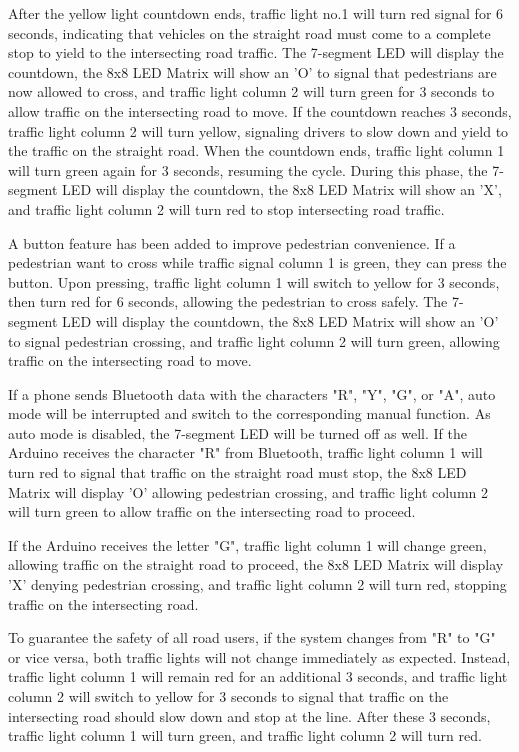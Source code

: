\documentclass[conference, onecolumn]{IEEEtran}
\begin{document}
After the yellow light countdown ends, traffic light no.1 will turn red signal for 6 seconds, indicating that vehicles on the straight road must come to a complete stop to yield to the intersecting road traffic. The 7-segment LED will display the countdown, the 8x8 LED Matrix will show an 'O' to signal that pedestrians are now allowed to cross, and traffic light column 2 will turn green for 3 seconds to allow traffic on the intersecting road to move. If the countdown reaches 3 seconds, traffic light column 2 will turn yellow, signaling drivers to slow down and yield to the traffic on the straight road. When the countdown ends, traffic light column 1 will turn green again for 3 seconds, resuming the cycle. During this phase, the 7-segment LED will display the countdown, the 8x8 LED Matrix will show an 'X', and traffic light column 2 will turn red to stop intersecting road traffic.\par

A button feature has been added to improve pedestrian convenience. If a pedestrian want to cross while traffic signal column 1 is green, they can press the button. Upon pressing, traffic light column 1 will switch to yellow for 3 seconds, then turn red for 6 seconds, allowing the pedestrian to cross safely. The 7-segment LED will display the countdown, the 8x8 LED Matrix will show an 'O' to signal pedestrian crossing, and traffic light column 2 will turn green, allowing traffic on the intersecting road to move.\par

If a phone sends Bluetooth data with the characters "R", "Y", "G", or "A", auto mode will be interrupted and switch to the corresponding manual function. As auto mode is disabled, the 7-segment LED will be turned off as well. If the Arduino receives the character "R" from Bluetooth, traffic light column 1 will turn red to signal that traffic on the straight road must stop, the 8x8 LED Matrix will display 'O' allowing pedestrian crossing, and traffic light column 2 will turn green to allow traffic on the intersecting road to proceed.\par

If the Arduino receives the letter "G", traffic light column 1 will change green, allowing traffic on the straight road to proceed, the 8x8 LED Matrix will display 'X' denying pedestrian crossing, and traffic light column 2 will turn red, stopping traffic on the intersecting road.\par

To guarantee the safety of all road users, if the system changes from "R" to "G" or vice versa, both traffic lights will not change immediately as expected. Instead, traffic light column 1 will remain red for an additional 3 seconds, and traffic light column 2 will switch to yellow for 3 seconds to signal that traffic on the intersecting road should slow down and stop at the line. After these 3 seconds, traffic light column 1 will turn green, and traffic light column 2 will turn red.\par
\end{document}

